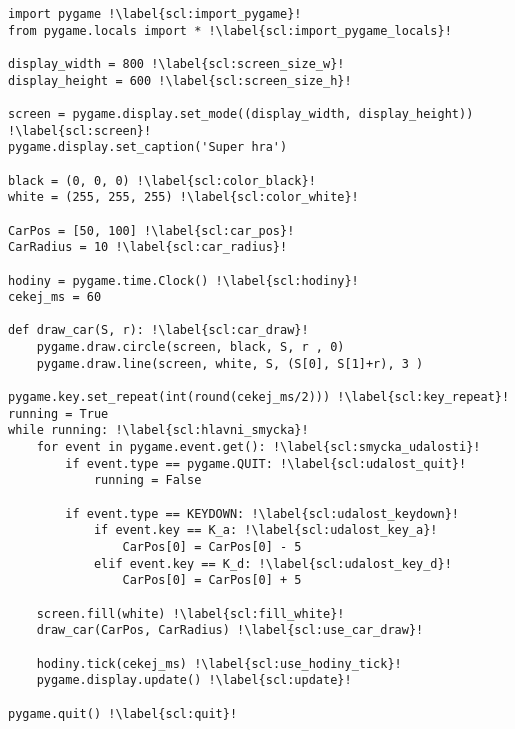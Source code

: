 \begin{minipage}[t]{.45\textwidth}
\begin{code}
\begin{verbatim}
import pygame !\label{scl:import_pygame}!
from pygame.locals import * !\label{scl:import_pygame_locals}!

display_width = 800 !\label{scl:screen_size_w}!
display_height = 600 !\label{scl:screen_size_h}!

screen = pygame.display.set_mode((display_width, display_height)) !\label{scl:screen}!
pygame.display.set_caption('Super hra')

black = (0, 0, 0) !\label{scl:color_black}!
white = (255, 255, 255) !\label{scl:color_white}!

CarPos = [50, 100] !\label{scl:car_pos}!
CarRadius = 10 !\label{scl:car_radius}!

hodiny = pygame.time.Clock() !\label{scl:hodiny}!
cekej_ms = 60

def draw_car(S, r): !\label{scl:car_draw}!
    pygame.draw.circle(screen, black, S, r , 0)
    pygame.draw.line(screen, white, S, (S[0], S[1]+r), 3 )

pygame.key.set_repeat(int(round(cekej_ms/2))) !\label{scl:key_repeat}!
running = True
while running: !\label{scl:hlavni_smycka}!
    for event in pygame.event.get(): !\label{scl:smycka_udalosti}!
        if event.type == pygame.QUIT: !\label{scl:udalost_quit}!
		    running = False
            
        if event.type == KEYDOWN: !\label{scl:udalost_keydown}!
            if event.key == K_a: !\label{scl:udalost_key_a}!
                CarPos[0] = CarPos[0] - 5
            elif event.key == K_d: !\label{scl:udalost_key_d}!
                CarPos[0] = CarPos[0] + 5
            
    screen.fill(white) !\label{scl:fill_white}!
    draw_car(CarPos, CarRadius) !\label{scl:use_car_draw}!
     
    hodiny.tick(cekej_ms) !\label{scl:use_hodiny_tick}!
    pygame.display.update() !\label{scl:update}!

pygame.quit() !\label{scl:quit}!
\end{verbatim}

\label{code:grafika_prvni_hybaci}
\end{code}
\end{minipage}

